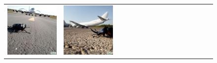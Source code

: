 \begin{figure}
\begin{adjustwidth}{-0.8in}{-0.5in}
\begin{tabular}{cccccccccccccccccccc}
\multicolumn{3}{c}{\includegraphics[width=\twobytwocolwidth\textwidth]{figures/limitations/rhino3.jpg}} &
\multicolumn{3}{c}{\includegraphics[width=\twobytwocolwidth\textwidth]{figures/limitations/rhino4.jpg}} \\

\end{tabular}
\end{adjustwidth}
\end{figure}
